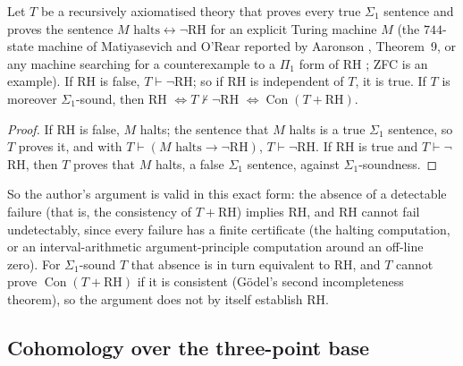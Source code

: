 \begin{proposition}\label{prop:detect}
Let $T$ be a recursively axiomatised theory that proves every true $\Sigma_1$ sentence and proves the sentence $M\text{ halts}\leftrightarrow\neg\text{RH}$ for an explicit Turing machine $M$ (the $744$-state machine of Matiyasevich and O'Rear reported by Aaronson \cite{Aaronson}, Theorem~9, or any machine searching for a counterexample to a $\Pi_1$ form of RH \cite{DMR}; ZFC is an example). If RH is false, $T\vdash\neg$RH; so if RH is independent of $T$, it is true. If $T$ is moreover $\Sigma_1$-sound, then RH $\iff T\nvdash\neg$RH $\iff\operatorname{Con}(T+\text{RH})$.
\end{proposition}

\begin{proof}
If RH is false, $M$ halts; the sentence that $M$ halts is a true $\Sigma_1$ sentence, so $T$ proves it, and with $T\vdash(M\text{ halts}\to\neg\text{RH})$, $T\vdash\neg$RH. If RH is true and $T\vdash\neg$RH, then $T$ proves that $M$ halts, a false $\Sigma_1$ sentence, against $\Sigma_1$-soundness.
\end{proof}

So the author's argument is valid in this exact form: the absence of a detectable failure (that is, the consistency of $T+$RH) implies RH, and RH cannot fail undetectably, since every failure has a finite certificate (the halting computation, or an interval-arithmetic argument-principle computation around an off-line zero). For $\Sigma_1$-sound $T$ that absence is in turn equivalent to RH, and $T$ cannot prove $\operatorname{Con}(T+\text{RH})$ if it is consistent (Gödel's second incompleteness theorem), so the argument does not by itself establish RH.

\subsection{Cohomology over the three-point base}

